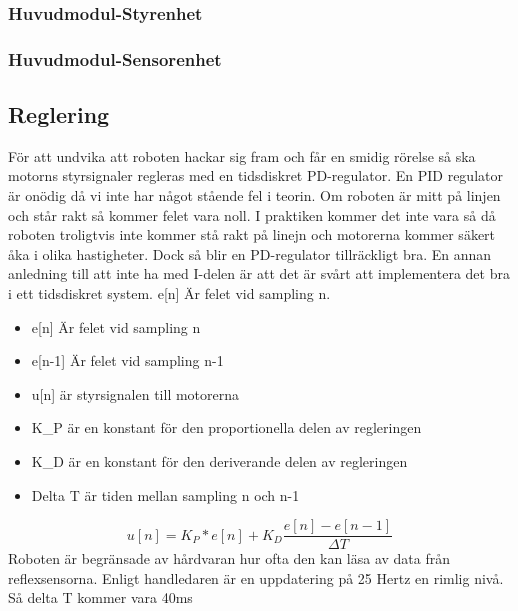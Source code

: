\subsubsection{Huvudmodul-Styrenhet}
\subsubsection{Huvudmodul-Sensorenhet}
\subsection{Reglering}
För att undvika att roboten hackar sig fram och får en smidig rörelse så ska motorns styrsignaler regleras med en tidsdiskret PD-regulator. En PID regulator är onödig då vi inte har något stående fel i teorin. Om roboten är mitt på linjen och står rakt så kommer felet vara noll. I praktiken kommer det inte vara så då roboten troligtvis inte kommer stå rakt på linejn och motorerna kommer säkert åka i olika hastigheter. Dock så blir en PD-regulator tillräckligt bra. En annan anledning till att inte ha med I-delen är att det är svårt att implementera det bra i ett tidsdiskret system. e[n] Är felet vid sampling n. 
\begin{itemize}
\item e[n] Är felet vid sampling n
\item e[n-1] Är felet vid sampling n-1
\item u[n] är styrsignalen till motorerna
\item K\_P är en konstant för den proportionella delen av regleringen
\item K\_D är en konstant för den deriverande delen av regleringen
\item Delta T är tiden mellan sampling n och n-1
 
\end{itemize}
 $$ u[n] = K_P*e[n] + K_D\frac{e[n]-e[n-1]}{\Delta T}$$
 Roboten är begränsade av hårdvaran hur ofta den kan läsa av data från reflexsensorna. Enligt handledaren är en uppdatering på 25 Hertz en rimlig nivå. Så delta T kommer vara 40ms
